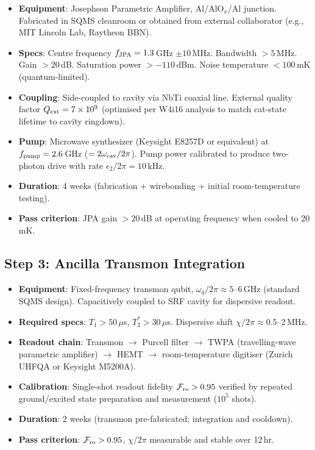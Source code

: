 \documentclass[11pt]{article}
\theoremstyle{definition}
\theoremstyle{remark}
\newcommand{\ee}[1]{\times 10^{#1}}
\begin{document}
\begin{itemize}[nosep]
\item \textbf{Equipment}: Josephson Parametric Amplifier, Al/AlO$_x$/Al
  junction. Fabricated in SQMS cleanroom or obtained from external
  collaborator (e.g., MIT Lincoln Lab, Raytheon BBN).
\item \textbf{Specs}: Centre frequency $f_{\rm JPA} = 1.3$\,GHz
  $\pm 10$\,MHz. Bandwidth $> 5$\,MHz. Gain $> 20$\,dB. Saturation
  power $> -110$\,dBm. Noise temperature $< 100$\,mK (quantum-limited).
\item \textbf{Coupling}: Side-coupled to cavity via NbTi coaxial line.
  External quality factor $Q_{\rm ext} = 7\ee{9}$ (optimised per W4i16
  analysis to match cat-state lifetime to cavity ringdown).
\item \textbf{Pump}: Microwave synthesizer (Keysight E8257D or
  equivalent) at $f_{\rm pump} = 2.6$\,GHz ($= 2\omega_{\rm cav}/2\pi$).
  Pump power calibrated to produce two-photon drive with rate
  $\epsilon_2/2\pi = 10$\,kHz.
\item \textbf{Duration}: 4 weeks (fabrication + wirebonding + initial
  room-temperature testing).
\item \textbf{Pass criterion}: JPA gain $> 20$\,dB at operating frequency
  when cooled to 20\,mK.
\end{itemize}

\subsection{Step 3: Ancilla Transmon Integration}

\begin{itemize}[nosep]
\item \textbf{Equipment}: Fixed-frequency transmon qubit,
  $\omega_q/2\pi \approx 5$--6\,GHz (standard SQMS design). Capacitively
  coupled to SRF cavity for dispersive readout.
\item \textbf{Required specs}: $T_1 > 50\,\mu$s, $T_2^* > 30\,\mu$s.
  Dispersive shift $\chi/2\pi \approx 0.5$--2\,MHz.
\item \textbf{Readout chain}: Transmon $\rightarrow$ Purcell filter
  $\rightarrow$ TWPA (travelling-wave parametric amplifier) $\rightarrow$
  HEMT $\rightarrow$ room-temperature digitiser (Zurich UHFQA or
  Keysight M5200A).
\item \textbf{Calibration}: Single-shot readout fidelity
  $\mathcal{F}_{\rm ro} > 0.95$ verified by repeated ground/excited
  state preparation and measurement ($10^5$ shots).
\item \textbf{Duration}: 2 weeks (transmon pre-fabricated; integration
  and cooldown).
\item \textbf{Pass criterion}: $\mathcal{F}_{\rm ro} > 0.95$,
  $\chi/2\pi$ measurable and stable over 12\,hr.
\end{itemize}
\end{document}
